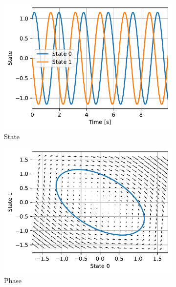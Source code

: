 \documentclass{cmc}
\begin{document}
\begin{figure}[H]
  \centering
  \begin{subfigure}[b]{0.49\textwidth}
    \centering \includegraphics[width=1.0\textwidth]{figures/periodic_state}
    \caption{\label{fig:pend-periodic-state} State}
  \end{subfigure}
  \begin{subfigure}[b]{0.49\textwidth}
    \centering \includegraphics[width=1.0\textwidth]{figures/periodic_phase}
    \caption{\label{fig:pend-periodic-phase} Phase}
  \end{subfigure}
  \caption{\label{fig:pend-periodic}}
\end{figure}
\end{document}

